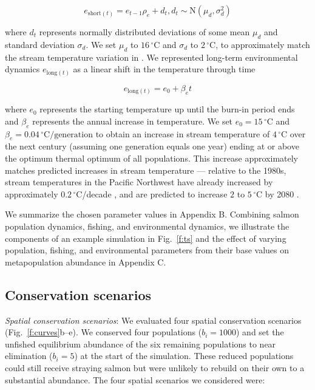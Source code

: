\documentclass[12pt,english]{article}
\newcommand{\somparam}{Appendix B}
\newcommand{\somsens}{Appendix C}
\begin{document}
\begin{spacing}{1.9}
\[e_{\mathrm{short}(t)} = e_{t-1} \rho_e + d_t, d_t \sim \mathrm{N}(\mu_d, \sigma_d^2)\]

\noindent
where $d_t$ represents normally distributed deviations of some mean $\mu_d$ and standard deviation $\sigma_d$. We set $\mu_d$ to $16\,^{\circ}\mathrm{C}$ and $\sigma_d$ to $2\,^{\circ}\mathrm{C}$, to approximately match the stream temperature variation in \citet{eliason2011}. We represented long-term environmental dynamics $e_{\mathrm{long}(t)}$ as a linear shift in the temperature through time

\[e_{\mathrm{long}(t)} = e_0 + \beta_e t\]

\noindent
where $e_0$ represents the starting temperature up until the burn-in period ends and $\beta_e$ represents the annual increase in temperature. We set $e_0 = 15\,^{\circ}\mathrm{C}$ and $\beta_e = 0.04\,^{\circ}\mathrm{C} / \mathrm{generation}$ to obtain an increase in stream temperature of $4\,^{\circ}\mathrm{C}$ over the next century (assuming one generation equals one year) ending at or above the optimum thermal optimum of all populations. This increase approximately matches predicted increases in stream temperature --- relative to the 1980s, stream temperatures in the Pacific Northwest have already increased by approximately $0.2\,^{\circ}\mathrm{C}$/decade \citep{isaak2012}, and are predicted to increase $2$ to $5\,^{\circ}\mathrm{C}$ by 2080 \citep{mantua2010}.

We summarize the chosen parameter values in \somparam. Combining salmon population dynamics, fishing, and environmental dynamics, we illustrate the components of an example simulation in Fig.~\ref{f:ts} and the effect of varying population, fishing, and environmental parameters from their base values on metapopulation abundance in \somsens.

\subsection{Conservation scenarios}\label{conservation-scenarios}

\emph{Spatial conservation scenarios}: We evaluated four spatial conservation scenarios (Fig.~\ref{f:curves}b--e). We conserved four populations ($b_i = 1000$) and set the unfished equilibrium abundance of the six remaining populations to near elimination ($b_i = 5$) at the start of the simulation. These reduced populations could still receive straying salmon but were unlikely to rebuild on their own to a substantial abundance. The four spatial scenarios we considered were:


\end{spacing}
\end{document}
